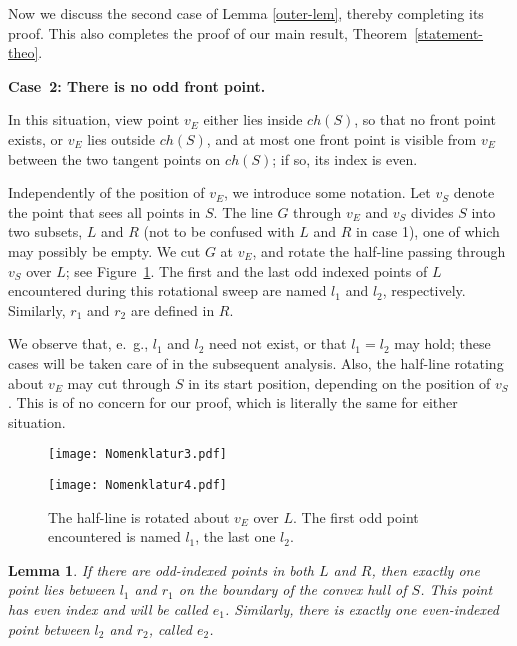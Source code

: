 \documentclass[11pt]{article}
\newtheorem{lemma}{Lemma}
\begin{document}
Now we discuss the second case of Lemma \ref{outer-lem}, thereby completing its proof.
This also completes the proof of our main result, Theorem~\ref{statement-theo}.

\bigskip

{\bf Case~2: There is no odd front point.}

In this situation, view point $v_E$ either lies inside $ch(S)$, so that no front point exists, or $v_E$ lies outside $ch(S)$,
and at most one front point is visible from $v_E$ between the two tangent points on $ch(S)$; if so, its index is even. 

Independently of the position of $v_E$,  we introduce some notation.
Let $v_S$ denote the point that sees all points in $S$. 
The line $G$ through $v_E$ and $v_S$ divides
$S$ into two subsets, $L$ and $R$ (not to be confused with $L$ and $R$ in case 1), one of which may possibly be empty.
We cut $G$ at $v_E$, and rotate the half-line passing through $v_S$ over $L$; see
Figure~\ref{Nomenklatur3-fig}. The first and the last odd indexed points of $L$ encountered
during this rotational sweep are named $l_1$ and $l_2$, respectively. 
Similarly, $r_1$ and $r_2$ are defined in $R$.

We observe that, e.~g., $l_1$ and $l_2$ need not exist, or that $l_1=l_2$ may hold; these cases will be taken
care of in the subsequent analysis. Also, the half-line rotating about $v_E$ may cut through $S$ in its
start position, depending on the position of $v_S$. This is of no concern for our proof, which is literally the
same for either situation.
\begin{figure}[hbtp]\begin{minipage}[t]{0.4\textwidth}
\texttt{[image: Nomenklatur3.pdf]}\end{minipage}
\hspace{2cm}
\begin{minipage}[t]{0.4\textwidth}
\texttt{[image: Nomenklatur4.pdf]}\end{minipage}
\caption{The half-line is rotated about $v_E$ over $L$. The first odd point encountered is named $l_1$, the last one $l_2$. }
\label{Nomenklatur3-fig}
\end{figure}
\begin{lemma} If there are odd-indexed points in both $L$ and $R$, then exactly one point lies 
between $l_1$ and $r_1$ on the boundary of the convex hull of $S$.
This point has even index and will be called $e_1$. Similarly, there is exactly one even-indexed point between $l_2$ and $r_2$, 
called $e_2$.
\end{lemma}
\end{document}
